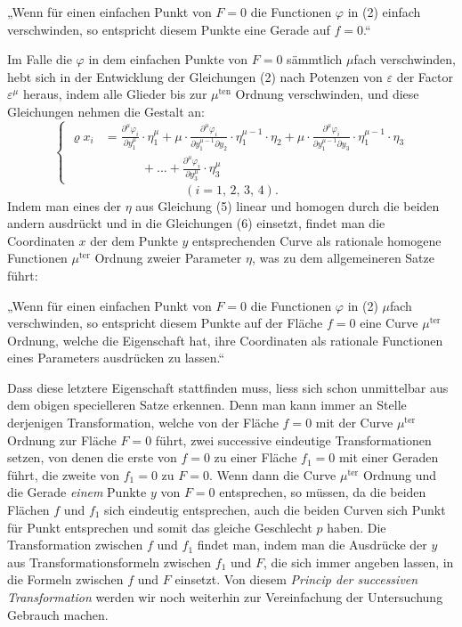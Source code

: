 \documentclass{article}
\begin{document}
„Wenn für einen einfachen Punkt von $F = 0$ die Functionen $\varphi$ in (2) einfach verschwinden, so entspricht diesem Punkte eine Gerade auf $f = 0$.“

Im Falle die $\varphi$ in dem einfachen Punkte von $F = 0$ sämmtlich $\mu$fach verschwinden, hebt sich in der Entwicklung der Gleichungen (2) nach Potenzen von $\varepsilon$ der Factor $\varepsilon^\mu$ heraus, indem alle Glieder bis zur $\mu^{\text{ten}}$ Ordnung verschwinden, und diese Gleichungen nehmen die Gestalt an:
\[
\left\{
\begin{aligned}
\varrho x_i &= \frac{\partial^\mu \varphi_i}{\partial y_1^\mu} \cdot \eta_1^\mu + \mu \cdot \frac{\partial^\mu \varphi_i}{\partial y_1^{\mu-1} \partial y_2} \cdot \eta_1^{\mu-1} \cdot \eta_2 + \mu \cdot \frac{\partial^\mu \varphi_i}{\partial y_1^{\mu-1} \partial y_3} \cdot \eta_1^{\mu-1} \cdot \eta_3 \\
&\qquad\quad + \dots + \frac{\partial^\mu \varphi_i}{\partial y_3^\mu} \cdot \eta_3^\mu
\end{aligned}
\right. \tag{6}
\]
\[
(i = 1,\, 2,\, 3,\, 4).
\]
Indem man eines der $\eta$ aus Gleichung (5) linear und homogen durch die beiden andern ausdrückt und in die Gleichungen (6) einsetzt, findet man die Coordinaten $x$ der dem Punkte $y$ entsprechenden Curve als rationale homogene Functionen $\mu^{\text{ter}}$ Ordnung zweier Parameter $\eta$, was zu dem allgemeineren Satze führt:

„Wenn für einen einfachen Punkt von $F = 0$ die Functionen $\varphi$ in (2) $\mu$fach verschwinden, so entspricht diesem Punkte auf der Fläche $f = 0$ eine Curve $\mu^{\text{ter}}$ Ordnung, welche die Eigenschaft hat, ihre Coordinaten als rationale Functionen eines Parameters ausdrücken zu lassen.“

Dass diese letztere Eigenschaft stattfinden muss, liess sich schon unmittelbar aus dem obigen specielleren Satze erkennen. Denn man kann immer an Stelle derjenigen Transformation, welche von der Fläche $f = 0$ mit der Curve $\mu^{\text{ter}}$ Ordnung zur Fläche $F = 0$ führt, zwei successive eindeutige Transformationen setzen, von denen die erste von $f = 0$ zu einer Fläche $f_1 = 0$ mit einer Geraden führt, die zweite von $f_1 = 0$ zu $F = 0$. Wenn dann die Curve $\mu^{\text{ter}}$ Ordnung und die Gerade \emph{einem} Punkte $y$ von $F = 0$ entsprechen, so müssen, da die beiden Flächen $f$ und $f_1$ sich eindeutig entsprechen, auch die beiden Curven sich Punkt für Punkt entsprechen und somit das gleiche Geschlecht $p$ haben. Die Transformation zwischen $f$ und $f_1$ findet man, indem man die Ausdrücke der $y$ aus Transformationsformeln zwischen $f_1$ und $F$, die sich immer angeben lassen, in die Formeln zwischen $f$ und $F$ einsetzt. Von diesem \emph{Princip der successiven Transformation} werden wir noch weiterhin zur Vereinfachung der Untersuchung Gebrauch machen.
\end{document}
